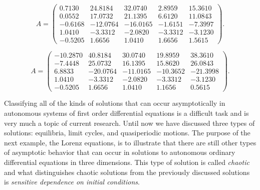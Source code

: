 \begin{exercise} \label{c14.5.2c}
\begin{equation*}
A=\left(\begin{array}{rrrrr}
    0.7130  & 24.8184  & 32.0740  &  2.8959  & 15.3610\\
    0.0552  & 17.0732  & 21.1395  &  6.6120  & 11.0843\\
   -0.6168  &-12.0764  &-16.0165  & -1.6151  & -7.3997\\
    1.0410  & -3.3312  & -2.0820  & -3.3312  & -3.1230\\
   -0.5205  &  1.6656  &  1.0410  &  1.6656  &  1.5615
\end{array}\right).
\end{equation*}
\end{exercise}

\begin{exercise} \label{c14.5.2d}
\begin{equation*}
A=\left(\begin{array}{rrrrr}
  -10.2870 &  40.8184 &  30.0740 &  19.8959 &  38.3610\\
   -7.4448 &  25.0732 &  16.1395 &  15.8620 &  26.0843\\
    6.8833 & -20.0764 & -11.0165 & -10.3652 & -21.3998\\
    1.0410 &  -3.3312 &  -2.0820 &  -3.3312 &  -3.1230\\
   -0.5205 &   1.6656 &   1.0410 &   1.1656 &   0.5615
\end{array}\right).
\end{equation*}
\end{exercise}


\label{S:chaos} 


Classifying all of the kinds of solutions that can occur asymptotically in 
autonomous systems of first order differential equations is a difficult task 
and is very much a topic of current research.  Until now we have discussed 
three types of solutions: equilibria, limit cycles, and quasiperiodic
motions.  The purpose of the next example, the Lorenz equations, is to 
illustrate that there are still other types of asymptotic behavior that can 
occur in solutions to autonomous ordinary differential equations in three 
dimensions.  This type of solution is called {\em chaotic\/} and what 
distinguishes chaotic solutions from the previously discussed solutions is 
{\em sensitive dependence on initial conditions\/}. 

